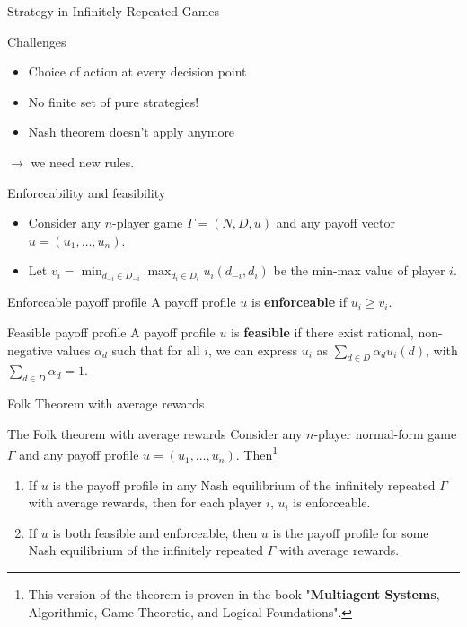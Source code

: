 \begin{frame}{Strategy in Infinitely Repeated Games}
    \begin{alertblock}{Challenges}
        \begin{itemize}
            \item Choice of action at every decision point
            \item No finite set of pure strategies!
            \item Nash theorem doesn't apply anymore
        \end{itemize}
        $\rightarrow$ we need new rules.
    \end{alertblock}
\end{frame}

\begin{frame}{Enforceability and feasibility}
    \begin{itemize}
        \item Consider any $n$-player game $\Gamma = (N, D, u)$ and any payoff vector
        $u = (u_1, \dots, u_n)$.
        \item Let $v_i= \min_{d_{-i}\in D_{-i}} \max_{d_i\in D_i} u_i(d_{-i}, d_i)$ be
        the min-max value of player $i$.
    \end{itemize}

    \begin{block}{Enforceable payoff profile}
        A payoff profile $u$ is \textbf{enforceable} if $u_i \geq v_i$.
    \end{block}

    \begin{block}{Feasible payoff profile}
        A payoff profile $u$ is \textbf{feasible} if there exist rational, non-negative
        values $\alpha_d$ such that for all $i$, we can express $u_i$ as
        $\sum_{d\in D} \alpha_d u_i(d)$, with $\sum_{d\in D} \alpha_d = 1$.
    \end{block}
\end{frame}

\begin{frame}{Folk Theorem with average rewards}

    \begin{block}{The Folk theorem with average rewards}
        Consider any $n$-player normal-form game $\Gamma$ and any payoff profile
        $u = (u_1, \dots, u_n)$. Then\footnote{This version of the theorem is proven
        in the book "\textbf{Multiagent Systems}, Algorithmic, Game-Theoretic, and Logical
        Foundations".}
        \begin{enumerate}
            \item If $u$ is the payoff profile in any Nash equilibrium of the infinitely
            repeated $\Gamma$ with average rewards, then for each player $i$, $u_i$ is enforceable.
            \item If $u$ is both feasible and enforceable, then $u$ is the payoff profile for some
            Nash equilibrium of the infinitely repeated $\Gamma$ with average rewards.
        \end{enumerate}
    \end{block}
\end{frame}

